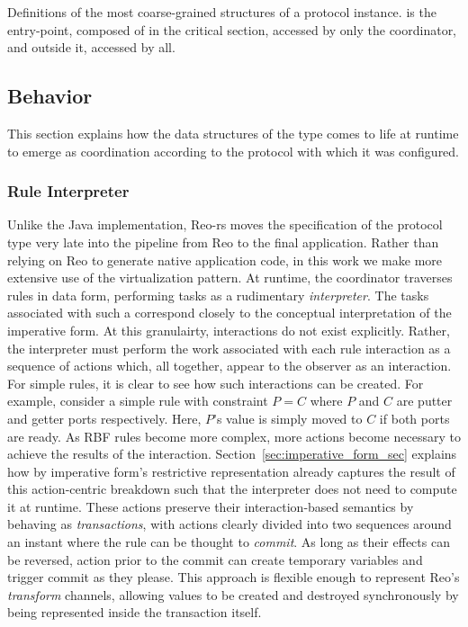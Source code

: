 \begin{listing}[ht]
	\centering
	\inputminted{rust}{proto.rs}
	\caption[Proto type with parts inside and outside the lock.]{Definitions of the most coarse-grained structures of a protocol instance.  is the entry-point, composed of  in the critical section, accessed by only the coordinator, and  outside it, accessed by all.}
	\label{listing:proto}
\end{listing}


\subsection{Behavior}
\label{sec:behavior_implementation}
This section explains how the data structures of the  type comes to life at runtime to emerge as coordination according to the protocol with which it was configured. 

\subsubsection{Rule Interpreter}
Unlike the Java implementation, Reo-rs moves the specification of the protocol type very late into the pipeline from Reo to the final application. Rather than relying on Reo to generate native application code, in this work we make more extensive use of the virtualization pattern. At runtime, the coordinator traverses rules in data form, performing tasks as a rudimentary \textit{interpreter}. The tasks associated with such a  correspond closely to the conceptual interpretation of the imperative form. At this granulairty, interactions do not exist explicitly. Rather, the interpreter must perform the work associated with each rule interaction as a sequence of actions which, all together, appear to the observer as an interaction. For simple rules, it is clear to see how such interactions can be created. For example, consider a simple rule with constraint $P=C$ where $P$ and $C$ are putter and getter ports respectively. Here, $P$'s value is simply moved to $C$ if both ports are ready. As RBF rules become more complex, more actions become necessary to achieve the results of the interaction. Section~\ref{sec:imperative_form_sec} explains how by imperative form's restrictive representation already captures the result of this action-centric breakdown such that the interpreter does not need to compute it at runtime. These actions preserve their interaction-based semantics by behaving as \textit{transactions}, with actions clearly divided into two sequences around an instant where the rule can be thought to \textit{commit}. As long as their effects can be reversed, action prior to the commit can create temporary variables and trigger commit as they please. This approach is flexible enough to represent Reo's \textit{transform} channels, allowing values to be created and destroyed synchronously by being represented inside the transaction itself. 


